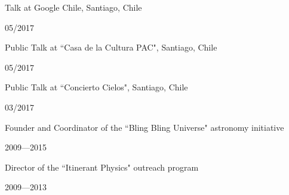 \documentclass[12pt, a4paper]{article} %
\begin{document}
\vspace{0.2cm}

\begin{minipage}[t]{0.7\textwidth}
\begin{flushleft}%
  \setlength{\leftskip}{0.2cm}%
Talk at Google Chile, Santiago, Chile
\end{flushleft}
\end{minipage}
\begin{minipage}[t]{0.3\textwidth}
\hfill 05/2017
\end{minipage}

\vspace{0.2cm}

\begin{minipage}[t]{0.7\textwidth}
\begin{flushleft}%
  \setlength{\leftskip}{0.2cm}%
Public Talk at ``Casa de la Cultura PAC", Santiago, Chile
\end{flushleft}
\end{minipage}
\begin{minipage}[t]{0.3\textwidth}
\hfill 05/2017
\end{minipage}

\vspace{0.2cm}

\begin{minipage}[t]{0.7\textwidth}
\begin{flushleft}%
  \setlength{\leftskip}{0.2cm}%
Public Talk at ``Concierto Cielos", Santiago, Chile
\end{flushleft}
\end{minipage}
\begin{minipage}[t]{0.3\textwidth}
\hfill 03/2017
\end{minipage}

\vspace{0.2cm}

\begin{minipage}[t]{0.8\textwidth}
\begin{flushleft}%
  \setlength{\leftskip}{0.2cm}%
Founder and Coordinator of the ``Bling Bling Universe" astronomy initiative
\end{flushleft}
\end{minipage}
\begin{minipage}[t]{0.2\textwidth}
\hfill 2009---2015
\end{minipage}


\vspace{0.2cm}


\begin{minipage}[t]{0.7\textwidth}
\begin{flushleft}%
  \setlength{\leftskip}{0.2cm}%
Director of the ``Itinerant Physics" outreach program
\end{flushleft}
\end{minipage}
\begin{minipage}[t]{0.3\textwidth}
\hfill 2009---2013
\end{minipage}
\end{document}
